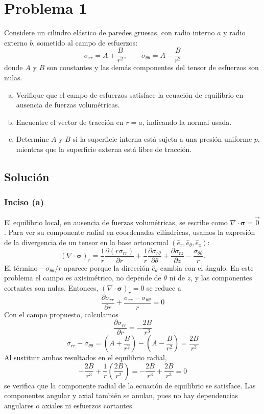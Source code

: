 \documentclass[a4paper]{article}
\begin{document}
\tableofcontents

\section{Problema 1}

Considere un cilindro elástico de paredes gruesas, con radio interno $a$ y radio externo $b$, sometido al campo de esfuerzos:
$$ \sigma_{rr} = A + \frac{B}{r^2}, \qquad \sigma_{\theta\theta} = A - \frac{B}{r^2} $$
donde $A$ y $B$ son constantes y las demás componentes del tensor de esfuerzos son nulas.
\begin{enumerate}[(a)]
    \item Verifique que el campo de esfuerzos satisface la ecuación de equilibrio en ausencia de fuerzas volumétricas.
    \item Encuentre el vector de tracción en $r=a$, indicando la normal usada.
    \item Determine $A$ y $B$ si la superficie interna está sujeta a una presión uniforme $p$, mientras que la superficie externa está libre de tracción.
\end{enumerate}



\subsection{Solución}

\subsubsection*{Inciso (a)}
El equilibrio local, en ausencia de fuerzas volumétricas, se escribe como $\nabla\cdot\boldsymbol{\sigma}=\vec{0}$. Para ver su componente radial en coordenadas cilíndricas, usamos la expresión de la divergencia de un tensor en la base ortonormal $(\hat e_r,\hat e_\theta,\hat e_z)$:
$$
(\nabla\cdot\boldsymbol{\sigma})_r
=\frac{1}{r}\frac{\partial(r\sigma_{rr})}{\partial r}
+\frac{1}{r}\frac{\partial\sigma_{r\theta}}{\partial\theta}
+\frac{\partial\sigma_{rz}}{\partial z}
-\frac{\sigma_{\theta\theta}}{r}.
$$
El término $-\sigma_{\theta\theta}/r$ aparece porque la dirección $\hat e_\theta$ cambia con el ángulo. En este problema el campo es axisimétrico, no depende de $\theta$ ni de $z$, y las componentes cortantes son nulas. Entonces, $(\nabla\cdot\boldsymbol{\sigma})_r=0$ se reduce a
$$ \frac{\partial \sigma_{rr}}{\partial r} + \frac{\sigma_{rr} - \sigma_{\theta\theta}}{r} = 0 $$
Con el campo propuesto, calculamos
$$ \frac{\partial \sigma_{rr}}{\partial r} = -\frac{2B}{r^3} $$
$$ \sigma_{rr} - \sigma_{\theta\theta} = \left(A + \frac{B}{r^2}\right) - \left(A - \frac{B}{r^2}\right) = \frac{2B}{r^2} $$
Al sustituir ambos resultados en el equilibrio radial,
$$ -\frac{2B}{r^3} + \frac{1}{r}\left(\frac{2B}{r^2}\right) = -\frac{2B}{r^3} + \frac{2B}{r^3} = 0 $$
se verifica que la componente radial de la ecuación de equilibrio se satisface. Las componentes angular y axial también se anulan, pues no hay dependencias angulares o axiales ni esfuerzos cortantes.
\end{document}
